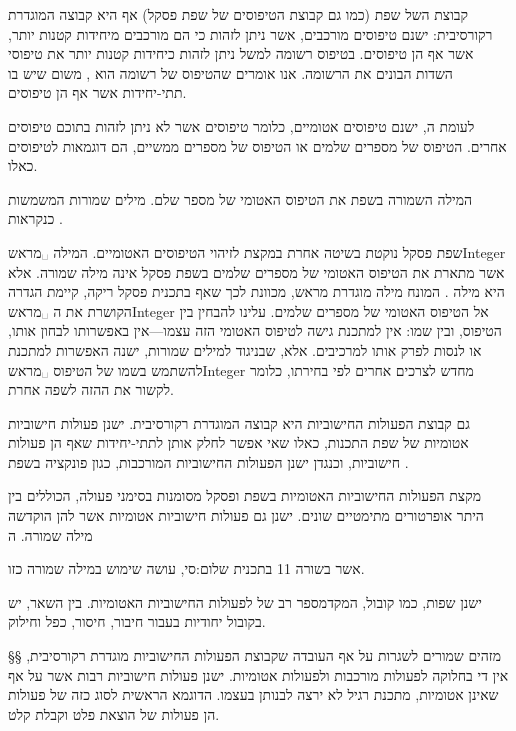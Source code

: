 קבוצת ה של שפת  (כמו גם קבוצת הטיפוסים של שפת פסקל) אף היא קבוצה
המוגדרת רקורסיבית: ישנם טיפוסים מורכבים, אשר ניתן לזהות כי הם מורכבים מיחידות
קטנות יותר, אשר אף הן טיפוסים. בטיפוס רשומה למשל ניתן לזהות כיחידות
קטנות יותר את טיפוסי השדות הבונים את הרשומה. אנו אומרים שהטיפוס של רשומה
הוא , משום שיש בו תתי-יחידות אשר אף הן טיפוסים.

לעומת ה, ישנם טיפוסים אטומיים, כלומר
טיפוסים אשר לא ניתן לזהות בתוכם טיפוסים אחרים. הטיפוס של מספרים שלמים או
הטיפוס של מספרים ממשיים, הם דוגמאות לטיפוסים כאלו.

המילה השמורה  בשפת   את הטיפוס האטומי של מספר שלם.
מילים
שמורות המשמשות כ נקראות .

שפת פסקל נוקטת בשיטה אחרת במקצת לזיהוי הטיפוסים האטומיים. המילה
␣מראש{Integer} אשר מתארת את הטיפוס האטומי של מספרים שלמים בשפת
פסקל אינה מילה שמורה. אלא היא מילה . המונח מילה מוגדרת
מראש, מכוונת לכך שאף בתכנית פסקל ריקה, קיימת הגדרה הקושרת את
ה ␣מראש{Integer} אל הטיפוס האטומי של מספרים שלמים. עלינו להבחין בין
הטיפוס, ובין שמו: אין למתכנת גישה לטיפוס האטומי הזה עצמו---אין באפשרותו לבחון
אותו, או לנסות לפרק אותו למרכיבים. אלא, שבניגוד למילים שמורות, ישנה האפשרות
למתכנת להשתמש בשמו של הטיפוס ␣מראש{Integer} מחדש לצרכים אחרים לפי
בחירתו, כלומר לקשור את ה הזה לשפה אחרת.

גם קבוצת הפעולות החישוביות היא קבוצה המוגדרת רקורסיבית. ישנן פעולות חישוביות
אטומיות של שפת התכנות, כאלו שאי אפשר לחלק אותן לתתי-יחידות שאף הן פעולות
חישוביות, וכנגדן ישנן הפעולות החישוביות המורכבות, כגון פונקציה בשפת .

מקצת הפעולות החישוביות האטומיות בשפת  ופסקל מסומנות בסימני פעולה, הכוללים
בין היתר אופרטורים מתימטיים שונים. ישנן גם פעולות חישוביות אטומיות אשר להן
הוקדשה מילה שמורה. ה
\begin{קוד}
\end{קוד}
אשר בשורה 11 ב תכנית שלום:סי, עושה שימוש במילה שמורה כזו.

ישנן שפות, כמו קובול, המקד מספר רב של 
לפעולות החישוביות האטומיות. בין השאר, יש בקובול  יחודיות בעבור חיבור, חיסור, כפל וחילוק.

§§ מזהים שמורים לשגרות
על אף העובדה שקבוצת הפעולות החישוביות מוגדרת רקורסיבית, אין די בחלוקה לפעולות
מורכבות ולפעולות אטומיות. ישנן פעולות חישוביות רבות אשר על אף שאינן אטומיות,
מתכנת רגיל לא ירצה לבנותן בעצמו. הדוגמא הראשית לסוג כזה של פעולות הן פעולות של
הוצאת פלט וקבלת קלט.

